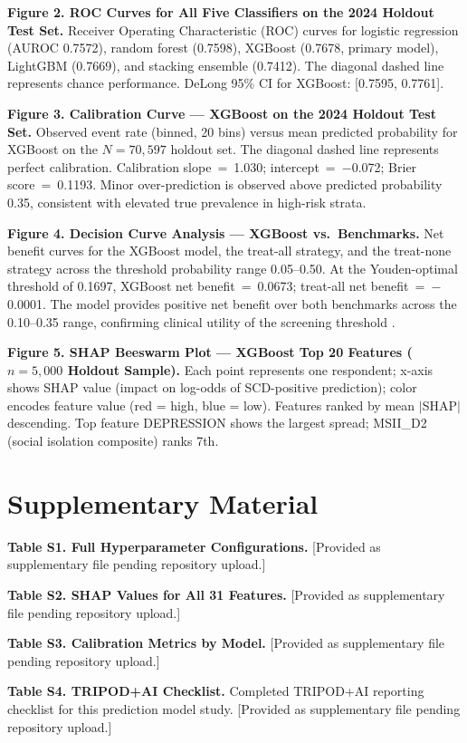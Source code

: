 \documentclass[12pt,a4paper]{article}
\begin{document}
\vspace{0.5em}

\noindent\textbf{Figure 2. ROC Curves for All Five Classifiers on the
2024 Holdout Test Set.}
Receiver Operating Characteristic (ROC) curves for logistic regression (AUROC
0.7572), random forest (0.7598), XGBoost (0.7678, primary model), LightGBM
(0.7669), and stacking ensemble (0.7412). The diagonal dashed line represents
chance performance. DeLong 95\% CI for XGBoost: [0.7595, 0.7761].

\vspace{0.5em}

\noindent\textbf{Figure 3. Calibration Curve --- XGBoost on the 2024 Holdout Test Set.}
Observed event rate (binned, 20 bins) versus mean predicted probability for
XGBoost on the $N = 70{,}597$ holdout set. The diagonal dashed line represents
perfect calibration. Calibration slope~=~1.030; intercept~=~$-$0.072;
Brier score~=~0.1193. Minor over-prediction is observed above predicted
probability 0.35, consistent with elevated true prevalence in high-risk strata.

\vspace{0.5em}

\noindent\textbf{Figure 4. Decision Curve Analysis --- XGBoost vs.\ Benchmarks.}
Net benefit curves for the XGBoost model, the treat-all strategy,
and the treat-none strategy across the threshold probability range
0.05--0.50. At the Youden-optimal threshold of 0.1697, XGBoost net
benefit~=~0.0673; treat-all net benefit~=~$-$0.0001. The model provides
positive net benefit over both benchmarks across the 0.10--0.35 range,
confirming clinical utility of the screening threshold \cite{Vickers2006}.

\vspace{0.5em}

\noindent\textbf{Figure 5. SHAP Beeswarm Plot --- XGBoost Top 20 Features
($n = 5{,}000$ Holdout Sample).}
Each point represents one respondent; x-axis shows SHAP value (impact on
log-odds of SCD-positive prediction); color encodes feature value (red =
high, blue = low). Features ranked by mean $|$SHAP$|$ descending. Top feature
DEPRESSION shows the largest spread; MSII\_D2 (social isolation composite)
ranks 7th.

\section*{Supplementary Material}

\noindent\textbf{Table S1. Full Hyperparameter Configurations.}
[Provided as supplementary file pending repository upload.]

\noindent\textbf{Table S2. SHAP Values for All 31 Features.}
[Provided as supplementary file pending repository upload.]

\noindent\textbf{Table S3. Calibration Metrics by Model.}
[Provided as supplementary file pending repository upload.]

\noindent\textbf{Table S4. TRIPOD+AI Checklist.}
Completed TRIPOD+AI reporting checklist \cite{Collins2024} for this
prediction model study. [Provided as supplementary file pending
repository upload.]
\end{document}
